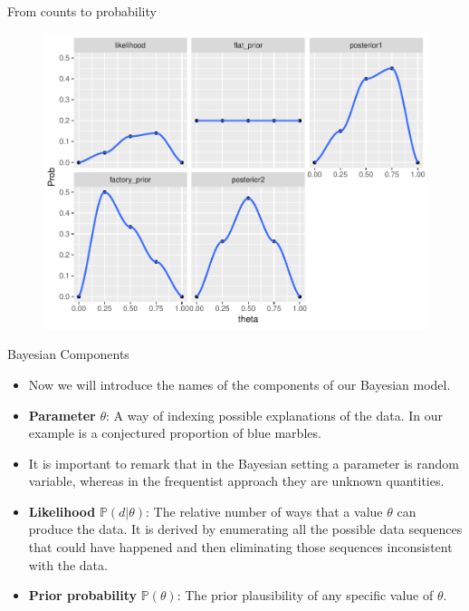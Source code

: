 \documentclass[handout]{beamer}
\begin{document}
\begin{frame}{From counts to probability}
\scriptsize{
\begin{figure}[h!]
	\centering
	\includegraphics[scale=0.63]{pics/marbles_dist.pdf}
\end{figure}
 } 
 

\end{frame}


\begin{frame}{Bayesian Components}
\scriptsize{
\begin{itemize}
\item Now we will introduce the names of the components of our Bayesian model.  \\ 

\item \textbf{Parameter} $\theta$:  A way of indexing possible explanations of the data. In our example is a conjectured proportion of blue marbles. 

\item It is important to remark that in the Bayesian setting a parameter is random variable, whereas in the frequentist approach they are unknown quantities. 

\item \textbf{Likelihood} $\mathbb{P}(d|\theta)$: The relative number of ways that a value $\theta$ can produce the data. It is derived by enumerating all the possible data sequences that could have happened and then eliminating those sequences inconsistent with the data.
\item \textbf{Prior probability} $\mathbb{P}(\theta)$: The prior plausibility of any specific value of $\theta$.
 
\end{itemize}
 } 

\end{frame}
\end{document}
